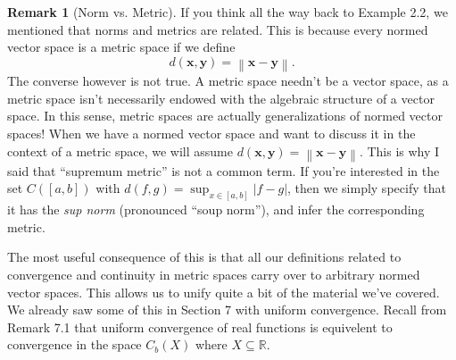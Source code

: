 \documentclass{article}
\newcommand{\R}{\mathbb{R}}
\newcommand{\x}{\mathbf{x}}
\newcommand{\y}{\mathbf{y}}
\newcommand{\norm}[1]{\left\lVert#1\right\rVert}
\theoremstyle{definition}
\newtheorem{remark}{Remark}[section]
\begin{document}
		
	\begin{remark}[Norm vs. Metric]
		If you think all the way back to Example 2.2, we mentioned that norms and metrics are related. This is because every normed vector space is a metric space if we define $$ d(\x,\y)=\norm{\x-\y}.$$ The converse however is not true. A metric space needn't be a vector space, as a metric space isn't necessarily endowed with the algebraic structure of a vector space. In this sense, metric spaces are actually generalizations of normed vector spaces! When we have a normed vector space and want to discuss it in the context of a metric space, we will assume $ d(\x,\y)=\norm{\x-\y}.$ This is why I said that ``supremum metric'' is not a common term. If you're interested in the set $ C([a,b]) $ with $ d(f,g)=\sup_{x\in [a,b]}|f-g| $, then we simply specify that it has the \textit{\color{red}sup norm} (pronounced ``soup norm''), and infer the corresponding metric. 
		
		The most useful consequence of this is that all our definitions related to convergence and continuity in metric spaces carry over to arbitrary normed vector spaces. This allows us to unify quite a bit of the material we've covered. We already saw some of this in Section 7 with uniform convergence. Recall from Remark 7.1 that uniform convergence of real functions is equivelent to convergence in the space $C_b(X)$ where $X\subseteq \R$. 
	\end{remark}
	
\end{document}
